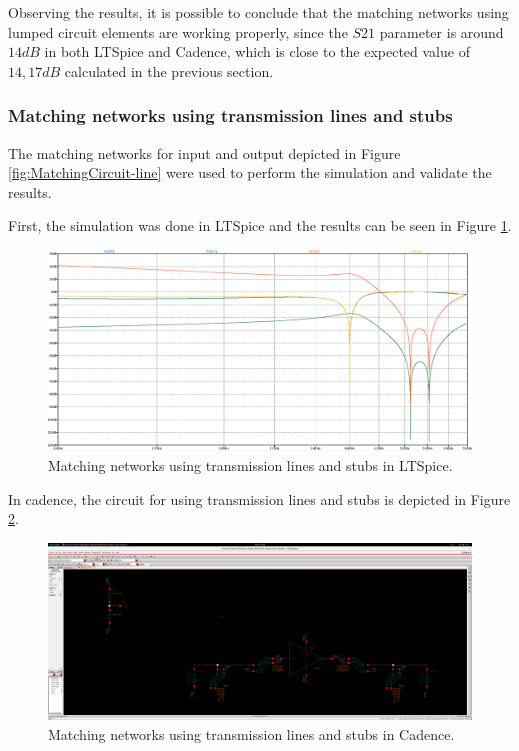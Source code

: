Observing the results, it is possible to conclude that the matching networks using lumped circuit elements are working properly, since the $S21$ parameter is around $14 dB$ in both LTSpice and Cadence, which is close to the expected value of $14,17 dB$ calculated in the previous section.

\subsubsection{Matching networks using transmission lines and stubs}

The matching networks for input and output depicted in Figure \ref{fig:MatchingCircuit-line} were used to perform the simulation and validate the results.

First, the simulation was done in LTSpice and the results can be seen in Figure \ref{fig:LT-LSMatchingCircuit}.
\begin{figure}[H]
    \centering
    \includegraphics[width=1\textwidth]{Images/LT-LS-gain.png}
    \caption{Matching networks using transmission lines and stubs in LTSpice.}
    \label{fig:LT-LSMatchingCircuit}
\end{figure}

In cadence, the circuit for using transmission lines and stubs is depicted in Figure \ref{fig:CAD-LScircuit}.
\begin{figure}[H]
    \centering
    \includegraphics[width=1\textwidth]{Images/CadenceLScircuit.png}
    \caption{Matching networks using transmission lines and stubs in Cadence.}
    \label{fig:CAD-LScircuit}
\end{figure}


